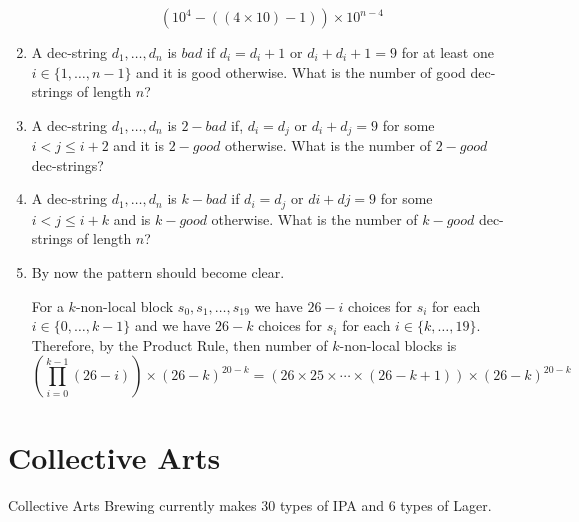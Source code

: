 \documentclass{article}
\begin{document}
\begin{enumerate}
   \[
      (10^4 - ((4 \times 10) - 1)) \times 10^{n-4}
   \] 

   \item A dec-string $d_1,\ldots,d_n$ is $bad$ if $d_i=d_i+1$ or $d_i+d_i+1=9$ for at least one $i\in\{1,\ldots,n-1\}$ and it is good otherwise. What is the number of good dec-strings of length $n$?
   
   \item A dec-string $d_1,\ldots,d_n$ is $2-bad$ if, $d_i=d_j$ or $d_i+d_j=9$ for some $i<j \leq i+2$ and it is $2-good$ otherwise. What is the number of $2-good$ dec-strings?
   
   \item A dec-string $d_1,\ldots,d_n$ is $k-bad$ if $d_i=d_j$ or $di+dj=9$ for some $i<j \leq i+k$ and is $k-good$ otherwise. What is the number of $k-good$ dec-strings of length $n$?

  \item By now the pattern should become clear.  
  
  For a $k$-non-local block $s_0,s_1,\ldots,s_{19}$ we have $26-i$ choices for $s_i$ for each $i\in\{0,\ldots,k-1\}$ and we have $26-k$ choices for $s_i$ for each $i\in\{k,\ldots,19\}$.
  Therefore, by the Product Rule, then number of $k$-non-local blocks is 
  \[
     \left(\prod_{i=0}^{k-1}(26-i)\right)\times (26-k)^{20-k} =
     \left(26\times 25\times\cdots\times (26-k+1)\right)\times(26-k)^{20-k}
     \enspace
  \]
\end{enumerate}

\section{Collective Arts}

Collective Arts Brewing currently makes 30 types of IPA and 6 types of Lager.
\end{document}
